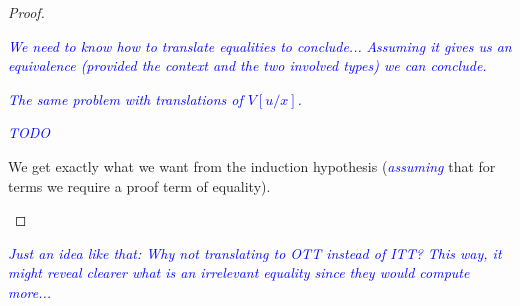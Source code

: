 \documentclass{amsart}
\newcommand\meta[1]{\noindent\textcolor{blue}{\emph{#1}}}
\begin{document}
\begin{proof}
\begin{caselist}
    \nextcase
    \begin{mathpar}
    \end{mathpar}
    \meta{We need to know how to translate equalities to conclude...}
    \meta{Assuming it gives us an equivalence (provided the context and the two
    involved types) we can conclude.}

    \nextcase
    \begin{mathpar}
    \end{mathpar}
    \meta{The same problem with translations of $V[u/x]$.}

    \nextcase
    \begin{mathpar}
    \end{mathpar}
    \meta{TODO}

    \nextcase
    \begin{mathpar}
    \end{mathpar}
    We get exactly what we want from the induction hypothesis (\meta{assuming}
    that for terms we require a proof term of equality).
  \end{caselist}
\end{proof}

\meta{Just an idea like that: Why not translating to OTT instead of ITT? This
way, it might reveal clearer what is an irrelevant equality since they would
compute more...}
\end{document}
